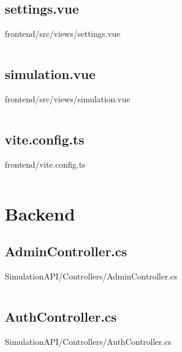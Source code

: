 \inputminted[linenos,breaklines,tabsize=2]{vue}{/Users/Henry/Desktop/NEAComputerScience/frontend/src/views/error.vue}

\makeatletter
\subsection*{settings.vue}
frontend/src/views/settings.vue
\def\@currentlabelname{settings.vue}
\label{code:frontend:src:views:settings.vue}
\makeatother

\inputminted[linenos,breaklines,tabsize=2]{vue}{/Users/Henry/Desktop/NEAComputerScience/frontend/src/views/settings.vue}

\makeatletter
\subsection*{simulation.vue}
frontend/src/views/simulation.vue
\def\@currentlabelname{simulation.vue}
\label{code:frontend:src:views:simulation.vue}
\makeatother

\inputminted[linenos,breaklines,tabsize=2]{vue}{/Users/Henry/Desktop/NEAComputerScience/frontend/src/views/simulation.vue}

\makeatletter
\subsection*{vite.config.ts}
frontend/vite.config.ts
\def\@currentlabelname{vite.config.ts}
\label{code:frontend:vite.config.ts}
\makeatother

\inputminted[linenos,breaklines,tabsize=2]{typescript}{/Users/Henry/Desktop/NEAComputerScience/frontend/vite.config.ts}

\section{Backend}
\makeatletter
\subsection*{AdminController.cs}
SimulationAPI/Controllers/AdminController.cs
\def\@currentlabelname{AdminController.cs}
\label{code:SimulationAPI:Controllers:AdminController.cs}
\makeatother

\inputminted[linenos,breaklines,tabsize=2]{csharp}{/Users/Henry/Desktop/NEAComputerScience/SimulationAPI/Controllers/AdminController.cs}

\makeatletter
\subsection*{AuthController.cs}
SimulationAPI/Controllers/AuthController.cs
\def\@currentlabelname{AuthController.cs}
\label{code:SimulationAPI:Controllers:AuthController.cs}
\makeatother

